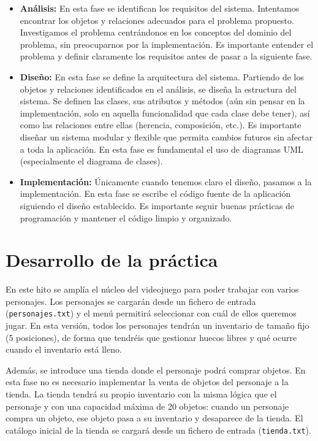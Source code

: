 \documentclass[11pt,a4paper]{article}
\begin{document}
\begin{itemize}
    \item \textbf{Análisis:} En esta fase se identifican los requisitos del sistema. Intentamos encontrar los objetos y relaciones adecuados para el problema propuesto. Investigamos el problema centrándonos en los conceptos del dominio del problema, sin preocuparnos por la implementación. Es importante entender el problema y definir claramente los requisitos antes de pasar a la siguiente fase.
    \item \textbf{Diseño:} En esta fase se define la arquitectura del sistema. Partiendo de los objetos y relaciones identificados en el análisis, se diseña la estructura del sistema. Se definen las clases, sus atributos y métodos (aún sin pensar en la implementación, solo en aquella funcionalidad que cada clase debe tener), así como las relaciones entre ellas (herencia, composición, etc.). Es importante diseñar un sistema modular y flexible que permita cambios futuros sin afectar a toda la aplicación. En esta fase es fundamental el uso de diagramas UML (especialmente el diagrama de clases).
    \item \textbf{Implementación:} Únicamente cuando tenemos claro el diseño, pasamos a la implementación. En esta fase se escribe el código fuente de la aplicación siguiendo el diseño establecido. Es importante seguir buenas prácticas de programación y mantener el código limpio y organizado.
\end{itemize}

\section{Desarrollo de la práctica}

En este hito se amplía el núcleo del videojuego para poder trabajar con varios personajes. Los personajes se cargarán desde un fichero de entrada (\texttt{personajes.txt}) y el menú permitirá seleccionar con cuál de ellos queremos jugar. En esta versión, todos los personajes tendrán un inventario de tamaño fijo (5 posiciones), de forma que tendréis que gestionar huecos libres y qué ocurre cuando el inventario está lleno.

Además, se introduce una tienda donde el personaje podrá comprar objetos. En esta fase no es necesario implementar la venta de objetos del personaje a la tienda. La tienda tendrá su propio inventario con la misma lógica que el personaje y con una capacidad máxima de 20 objetos: cuando un personaje compra un objeto, ese objeto pasa a su inventario y desaparece de la tienda.
El catálogo inicial de la tienda se cargará desde un fichero de entrada (\texttt{tienda.txt}).
\end{document}
